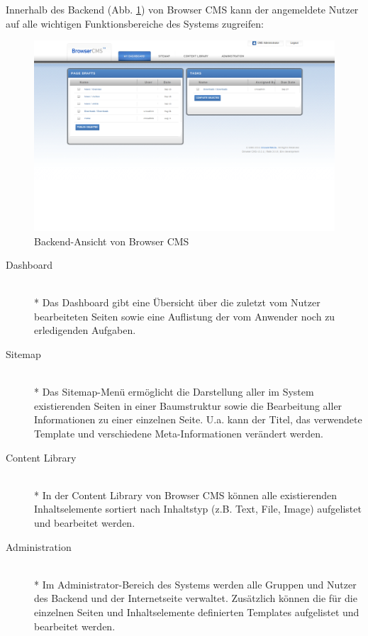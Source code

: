 Innerhalb des Backend (Abb. \ref{browserbackend}) von Browser CMS kann der angemeldete Nutzer auf alle wichtigen Funktionsbereiche des Systems zugreifen:


\begin{figure}[!h]
\begin{center}
\includegraphics[scale=0.3]{images/analyse/browser/backend.png}
\caption{Backend-Ansicht von Browser CMS}
\label{browserbackend}
\end{center}
\end{figure}


\begin{description}
\item[Dashboard]\mbox{~}\\*
Das Dashboard gibt eine Übersicht über die zuletzt vom Nutzer bearbeiteten Seiten sowie eine Auflistung der vom Anwender noch zu erledigenden Aufgaben.
\item[Sitemap]\mbox{~}\\*
Das Sitemap-Menü ermöglicht die Darstellung aller im System existierenden Seiten in einer Baumstruktur sowie die Bearbeitung aller Informationen zu einer einzelnen Seite. U.a. kann der Titel, das verwendete Template und verschiedene Meta-Informationen verändert werden.
\item[Content Library]\mbox{~}\\*
In der Content Library von Browser CMS können alle existierenden Inhaltselemente sortiert nach Inhaltstyp (z.B. Text, File, Image) aufgelistet und bearbeitet werden.
\item[Administration]\mbox{~}\\*
Im Administrator-Bereich des Systems werden alle Gruppen und Nutzer des Backend und der Internetseite verwaltet. Zusätzlich können die für die einzelnen Seiten und Inhaltselemente definierten Templates aufgelistet und bearbeitet werden.
\end{description}

